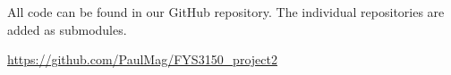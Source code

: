 All code can be found in our GitHub repository. The individual
repositories are added as submodules.

\url{https://github.com/PaulMag/FYS3150_project2}
